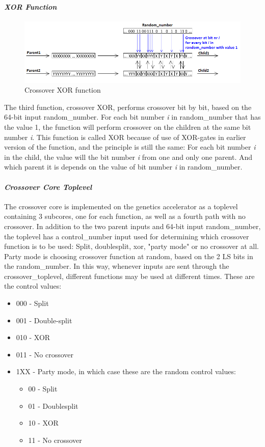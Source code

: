 \paragraph{\textit{XOR Function}}
\begin{figure}[H]
\includegraphics[width=\textwidth]{fpga/fig/crossover_xor.png}
\caption{Crossover XOR function}
\label{fig_crossover_xor}
\end{figure}

The third function, crossover XOR, performs crossover bit by bit, based on the 64-bit input random\_number.
For each bit number \emph{i} in random\_number that has the value 1, the function will perform crossover on the children at the same bit number \emph{i}.
This function is called XOR because of use of XOR-gates in earlier version of the function, and the principle is still the same: For each bit number \emph{i} in the child, the value will the bit number \emph{i} from one and only one parent.
And which parent it is depends on the value of bit number \emph{i} in random\_number.

\paragraph{\textit{Crossover Core Toplevel}}
The crossover core is implemented on the genetics accelerator as a toplevel containing 3 subcores, one for each function, as well as a fourth path with no crossover.
In addition to the two parent inputs and 64-bit input random\_number, the toplevel has a control\_number input used for determining which crossover function is to be used: Split, doublesplit, xor, "party mode" or no crossover at all.
Party mode is choosing crossover function at random, based on the 2 LS bits in the random\_number.
In this way, whenever inputs are sent through the crossover\_toplevel, different functions may be used at different times.
These are the control values:
\begin{itemize}
\item 000 - Split
\item 001 - Double-split
\item 010 - XOR
\item 011 - No crossover
\item 1XX - Party mode, in which case these are the random control values:
    \begin{itemize}
    \item 00 - Split
    \item 01 - Doublesplit
    \item 10 - XOR
    \item 11 - No crossover
    \end{itemize}
\end{itemize}
